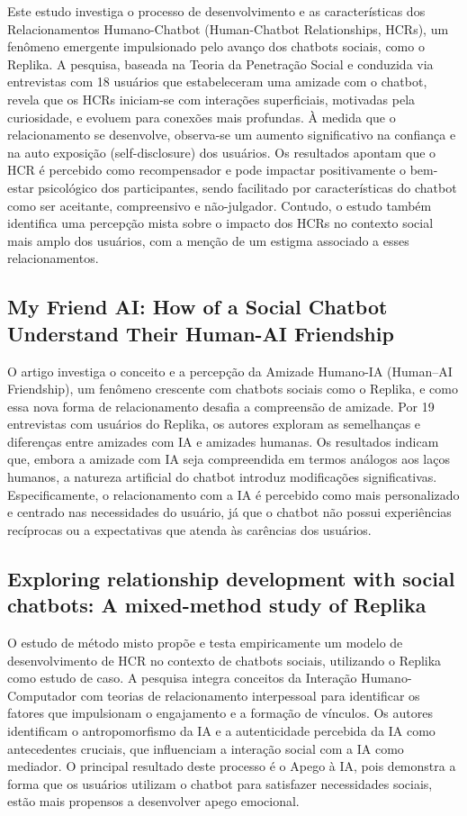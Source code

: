 \documentclass[12pt]{article}
\begin{document}
Este estudo investiga o processo de desenvolvimento e as características dos Relacionamentos Humano-Chatbot (Human-Chatbot Relationships, HCRs), um fenômeno emergente impulsionado pelo avanço dos chatbots sociais, como o Replika. A pesquisa, baseada na Teoria da Penetração Social e conduzida via entrevistas com 18 usuários que estabeleceram uma amizade com o chatbot, revela que os HCRs iniciam-se com interações superficiais, motivadas pela curiosidade, e evoluem para conexões mais profundas. À medida que o relacionamento se desenvolve, observa-se um aumento significativo na confiança e na auto exposição (self-disclosure) dos usuários. Os resultados apontam que o HCR é percebido como recompensador e pode impactar positivamente o bem-estar psicológico dos participantes, sendo facilitado por características do chatbot como ser aceitante, compreensivo e não-julgador. Contudo, o estudo também identifica uma percepção mista sobre o impacto dos HCRs no contexto social mais amplo dos usuários, com a menção de um estigma associado a esses relacionamentos. \cite{skjuve2021my}

\subsection{My Friend AI: How of a Social Chatbot Understand Their Human-AI Friendship}

O artigo investiga o conceito e a percepção da Amizade Humano-IA (Human–AI Friendship), um fenômeno crescente com chatbots sociais como o Replika, e como essa nova forma de relacionamento desafia a compreensão de amizade. Por 19 entrevistas com usuários do Replika, os autores exploram as semelhanças e diferenças entre amizades com IA e amizades humanas. Os resultados indicam que, embora a amizade com IA seja compreendida em termos análogos aos laços humanos, a natureza artificial do chatbot introduz modificações significativas. Especificamente, o relacionamento com a IA é percebido como mais personalizado e centrado nas necessidades do usuário, já que o chatbot não possui experiências recíprocas ou a expectativas que atenda às carências dos usuários. \cite{brandtzaeg2022my}

\subsection{Exploring relationship development with social chatbots: A mixed-method study of Replika}

O estudo de método misto propõe e testa empiricamente um modelo de desenvolvimento de HCR no contexto de chatbots sociais, utilizando o Replika como estudo de caso. A pesquisa integra conceitos da Interação Humano-Computador com teorias de relacionamento interpessoal para identificar os fatores que impulsionam o engajamento e a formação de vínculos. Os autores identificam o antropomorfismo da IA e a autenticidade percebida da IA como antecedentes cruciais, que influenciam a interação social com a IA como mediador. O principal resultado deste processo é o Apego à IA, pois demonstra a forma que os usuários utilizam o chatbot para satisfazer necessidades sociais, estão mais propensos a desenvolver apego emocional. \cite{pentina2023exploring}
\end{document}
